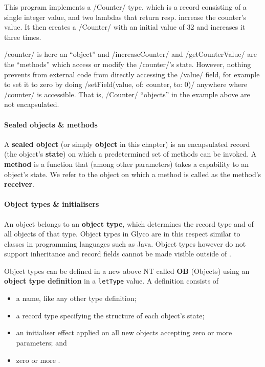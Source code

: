 \documentclass[main.tex]{subfiles}
\begin{document}
This program implements a \iil/Counter/ type, which is a record consisting of a single integer value, and two lambdas that return resp. increase the counter's value. It then creates a \iil/Counter/ with an initial value of 32 and increases it three times.

\iil/counter/ is here an \enquote{object} and \iil/increaseCounter/ and \iil/getCounterValue/ are the \enquote{methods} which access or modify the \iil/counter/'s state. However, nothing prevents from external code from directly accessing the \iil/value/ field, for example to set it to zero by doing \iil/setField(value, of: counter, to: 0)/ anywhere where \iil/counter/ is accessible. That is, \iil/Counter/ \enquote{objects} in the example above are not encapsulated.

\paragraph{Sealed objects \& methods} A \textbf{sealed object} (or simply \textbf{object} in this chapter) is an encapsulated record (the object's \textbf{state}) on which a predetermined set of methods can be invoked. A \textbf{method} is a function that (among other parameters) takes a capability to an object's state. We refer to the object on which a method is called as the method's \textbf{receiver}.

\paragraph{Object types \& initialisers} An object belongs to an \textbf{object type}, which determines the record type and  of all objects of that type. Object types in Glyco are in this respect similar to classes in programming languages such as Java. Object types however do not support inheritance and record fields cannot be made visible outside of .

Object types can be defined in a new  above NT called \textbf{OB} (Objects) using an \textbf{object type definition} in a \texttt{letType} value. A definition consists of
\begin{itemize}[nosep]
	\item a name, like any other type definition;
	\item a record type specifying the structure of each object's state;
	\item an initialiser effect applied on all new objects accepting zero or more parameters; and
	\item zero or more .
\end{itemize}
\end{document}
